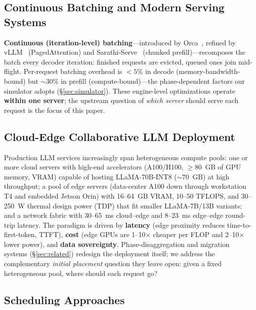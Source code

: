 \subsection{Continuous Batching and Modern Serving Systems}
\label{sec:bg-batching}

\textbf{Continuous (iteration-level) batching}---introduced by
Orca~\cite{yu2022orca}, refined by
vLLM~\cite{kwon2023vllm} (PagedAttention) and
Sarathi-Serve~\cite{agrawal2024sarathi} (chunked
prefill)---recomposes the batch every decoder iteration:
finished requests are evicted, queued ones join mid-flight.
Per-request batching overhead is $<5\%$ in decode
(memory-bandwidth-bound) but $\sim$30\% in prefill
(compute-bound)---the phase-dependent factors our simulator
adopts (\S\ref{sec:simulator}). These engine-level
optimizations operate
\textbf{within one server}; the upstream question of
\emph{which server} should serve each request is the focus of
this paper.

\subsection{Cloud-Edge Collaborative LLM Deployment}
\label{sec:bg-cloudedge}

Production LLM services increasingly span heterogeneous compute
pools: one or more cloud servers with high-end accelerators
(A100/H100, $\ge$80~GB of GPU memory, VRAM) capable of hosting
LLaMA-70B-INT8
($\sim$70~GB) at high throughput; a pool of edge servers
(data-center A100 down through workstation T4 and embedded
Jetson Orin) with 16--64~GB VRAM, 10--50 TFLOPS, and
30--250~W thermal design power (TDP) that fit smaller
LLaMA-7B/13B variants; and a
network fabric with 30--65~ms cloud--edge and 8--23~ms
edge--edge round-trip latency. The paradigm is driven by
\textbf{latency} (edge proximity reduces time-to-first-token,
TTFT),
\textbf{cost} (edge GPUs are 1--10$\times$ cheaper per FLOP and
2--10$\times$ lower power), and \textbf{data sovereignty}.
Phase-disaggregation and migration systems
(\S\ref{sec:related}) redesign the deployment itself; we
address the complementary \emph{initial placement} question
they leave open: given a fixed heterogeneous pool, where
should each request go?

\subsection{Scheduling Approaches}
\label{sec:bg-sched}

